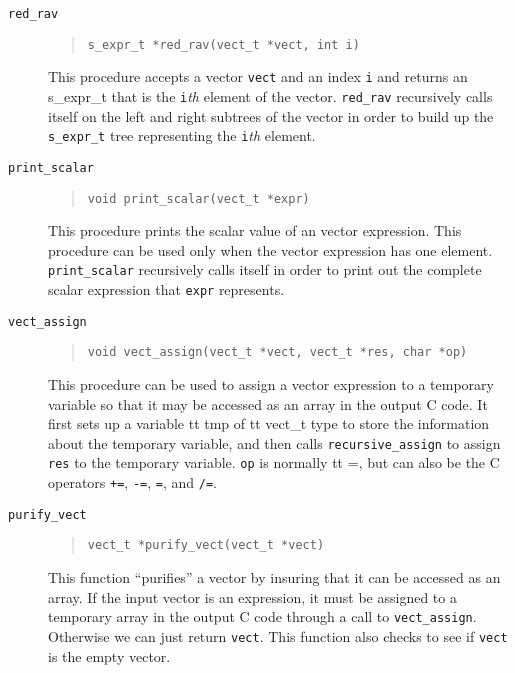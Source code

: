 \begin{description}
\item[{\tt red\_rav}]
\begin{quote}
\begin{verbatim}
s_expr_t *red_rav(vect_t *vect, int i)
\end{verbatim}
\end{quote}
This procedure accepts a vector {\tt vect} and an index {\tt i} and 
returns an s\_expr\_t that is the {\tt i}{\it th} element of the vector.
{\tt red\_rav} recursively calls itself on the left and right subtrees
of the vector in order to build up the {\tt s\_expr\_t} tree representing
the {\tt i}{\it th} element.  

\item[{\tt print\_scalar}]
\begin{quote}
\begin{verbatim}
void print_scalar(vect_t *expr)
\end{verbatim}
\end{quote}
This procedure prints the scalar value of
an vector expression.  This procedure can be used only when the vector
expression has one element.  {\tt print\_scalar} recursively calls 
itself in order to print out the complete scalar expression that 
{\tt expr} represents.

\item[{\tt vect\_assign}]
\begin{quote}
\begin{verbatim}
void vect_assign(vect_t *vect, vect_t *res, char *op)
\end{verbatim}
\end{quote}
This procedure can be used to assign a vector expression
to a temporary variable so that it may be accessed as an array in the
output C code.  It first sets up a variable {tt tmp} of {tt vect\_t} type
to store the information about the temporary variable, and then
calls {\tt recursive\_assign} to assign {\tt res} to
the temporary variable.  {\tt op} is normally {tt =}, but can also
be the C operators {\tt +=}, {\tt -=}, {\tt *=}, and {\tt /=}.

\item[{\tt purify\_vect}]
\begin{quote}
\begin{verbatim}
vect_t *purify_vect(vect_t *vect)
\end{verbatim}
\end{quote}
This function ``purifies'' a vector by insuring that it can be
accessed as an array.  If the input vector is an expression, it must be
assigned to a temporary array in the output C code through a call to
{\tt vect\_assign}.  Otherwise we can just return {\tt vect}.  This
function also checks to see if {\tt vect} is the empty vector.


\end{description}
